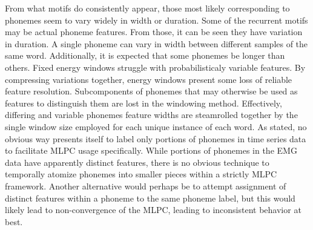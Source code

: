 \documentclass[conference]{IEEEtran}
\begin{document}
From what motifs do consistently appear, those most likely corresponding to phonemes seem to vary widely in width or duration. Some of the recurrent motifs may be actual phoneme features. From those, it can be seen they have variation in duration. A single phoneme can vary in width between different samples of the same word. Additionally, it is expected that some phonemes be longer than others. Fixed energy windows struggle with probabilisticaly variable features. By compressing variations together, energy windows present some loss of reliable feature resolution. Subcomponents of phonemes that may otherwise be used as features to distinguish them are lost in the windowing method. Effectively, differing and variable phonemes feature widths are steamrolled together by the single window size employed for each unique instance of each word. As stated, no obvious way presents itself to label only portions of phonemes in time series data to facilitate MLPC usage specifically. While portions of phonemes in the EMG data have apparently distinct features, there is no obvious technique to temporally atomize phonemes into smaller pieces within a strictly MLPC framework. Another alternative would perhaps be to attempt assignment of distinct features within a phoneme to the same phoneme label, but this would likely lead to non-convergence of the MLPC, leading to inconsistent behavior at best.
%
\end{document}
